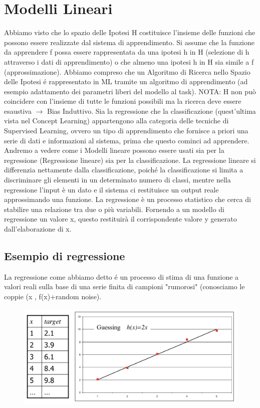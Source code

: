 \documentclass{article}
\begin{document}
\section{Modelli Lineari}
Abbiamo visto che lo spazio delle Ipotesi H costituisce l’insieme delle funzioni che possono essere realizzate dal sistema di apprendimento. Si assume che la funzione da apprendere f possa essere rappresentata da una ipotesi h in H (selezione di h attraverso i dati di apprendimento) o che almeno una ipotesi h in H sia simile a f (approssimazione). Abbiamo compreso che un Algoritmo di Ricerca nello Spazio delle Ipotesi é rappresentato in ML tramite un algoritmo di apprendimento (ad esempio adattamento dei parametri liberi del modello al task). NOTA: H non può coincidere con l’insieme di tutte le funzioni possibili ma la ricerca deve essere esaustiva $\rightarrow$ Bias Induttivo. \newline
Sia la regressione che la classificazione (quest'ultima vista nel Concept Learning) appartengono alla categoria delle tecniche di Supervised Learning, ovvero un tipo di apprendimento che fornisce a priori una serie di dati e informazioni al sistema, prima che questo cominci ad apprendere. Andremo a vedere come i Modelli lineare possono essere usati sia per la regressione (Regressione lineare) sia per la classificazione. La regressione lineare si differenzia nettamente dalla classificazione, poiché la classificazione si limita a discriminare gli elementi in un determinato numero di classi, mentre nella regressione l’input è un dato e il sistema ci restituisce un output reale approssimando una funzione. La regressione è un processo statistico che cerca di stabilire una relazione tra due o più variabili. Fornendo a un modello di regressione un valore x, questo restituirà il corrispondente valore y generato dall'elaborazione di x.

\subsection{Esempio di regressione}
La regressione come abbiamo detto é un processo di stima di una funzione a valori reali sulla base di una serie finita di campioni "rumorosi" (conosciamo le coppie (x , f(x)+random noise).
\begin{figure}[H]
    \centering
    \includegraphics[scale=0.4]{Images/esempioregressione.png}
\end{figure}
\end{document}
